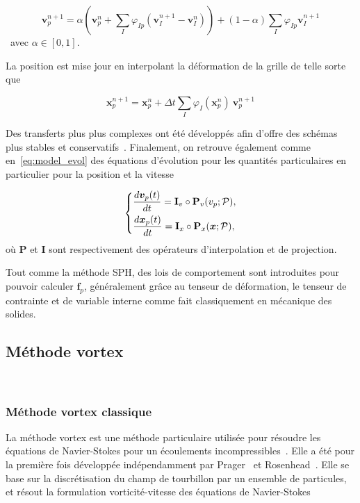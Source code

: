 \begin{equation*}
    \bm v_{p}^{n+1} = \alpha \left(\bm v_{p}^{n} + \sum_I \varphi_{Ip} (\bm v_I^{n+1} - \bm v_I^{n})\right) + (1- \alpha)\sum_I \varphi_{Ip} \bm v_I^{n+1}
\end{equation*}~avec $\alpha \in [0, 1]$.

La position est mise jour en interpolant la déformation de la grille de telle sorte que

\begin{equation*}
    \bm x_p^{n+1} = \bm x_p^{n} + \Delta t \sum_I \varphi_I(\bm x_p^n)~\bm v_p^{n+1}
\end{equation*}

Des transferts plus plus complexes ont été développés afin d'offre des schémas plus stables et conservatifs~\cite{jiang_affine_2015,fu_polynomial_2017,hu_moving_2018}. Finalement, on retrouve également comme en~\eqref{eq:model_evol} des équations d'évolution pour les quantités particulaires en particulier pour la position et la vitesse

\begin{gather}
    \left\{\begin{aligned}
         & \frac{d\bm v_p(t)}{dt} = \mathbf I_v \circ \mathbf P_v(v_p;\mathcal P), \\
         & \frac{d \bm{x}_p(t)}{d t} = \mathbf I_x \circ \mathbf P_x(\bm{x};\mathcal P),
    \end{aligned} \right.
\end{gather}où $\mathbf P$ et $\mathbf I$ sont respectivement des opérateurs d'interpolation et de projection.

Tout comme la méthode SPH, des lois de comportement sont introduites pour pouvoir calculer $\bm f_p$, généralement grâce au tenseur de déformation, le tenseur de contrainte et de variable interne comme fait classiquement en mécanique des solides.

\subsection{Méthode vortex}~\label{sec:vortex}

\subsubsection{Méthode vortex classique}

La méthode vortex est une méthode particulaire utilisée pour résoudre les équations de Navier-Stokes pour un écoulements incompressibles~\cite{Cottet_Koumoutsakos_2000}. Elle a été pour la première fois développée indépendamment par Prager~\cite{prager1928druckverteilung} et Rosenhead~\cite{rosenhead1931formation}. Elle se base sur la discrétisation du champ de tourbillon par un ensemble de particules, et résout la formulation vorticité-vitesse des équations de Navier-Stokes


